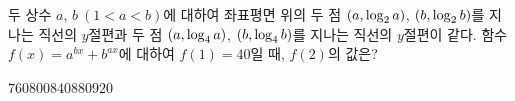 두 상수 $a$, $b\ (1<a<b)$에 대하여 좌표평면 위의 두 점 $(a{,}\mkern3mu\mathopen{}\log_2 a)$, $(b{,}\mkern3mu\mathopen{}\log_2 b)$를 지나는 직선의 $y$절편과 두 점 $(a{,}\mkern3mu\mathopen{}\log_4 a)$, $(b{,}\mkern3mu\mathopen{}\log_4 b)$를 지나는 직선의 $y$절편이 같다. 함수 $f(x)=a^{bx}+b^{ax}$에 대하여 $f(1)=40$일 때, $f(2)$의 값은?
\begin{choices32}{$760$}{$800$}{$840$}{$880$}{$920$}\end{choices32}
